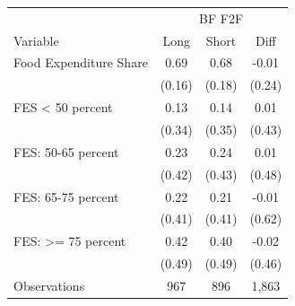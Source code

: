 \begin{tabular}{l*{3}c}
\hline\hline
 & \multicolumn{3}{c}{BF F2F}\\ 
Variable & Long & Short & Diff \\
\hline
Food Expenditure Share&0.69&0.68&-0.01\\
&(0.16)&(0.18)&(0.24)\\
FES < 50 percent&0.13&0.14&0.01\\
&(0.34)&(0.35)&(0.43)\\
FES: 50-65 percent&0.23&0.24&0.01\\
&(0.42)&(0.43)&(0.48)\\
FES: 65-75 percent&0.22&0.21&-0.01\\
&(0.41)&(0.41)&(0.62)\\
FES: >= 75 percent&0.42&0.40&-0.02\\
&(0.49)&(0.49)&(0.46)\\
\hline
Observations & 967 & 896 & 1,863 \\
\hline\hline
\end{tabular}
